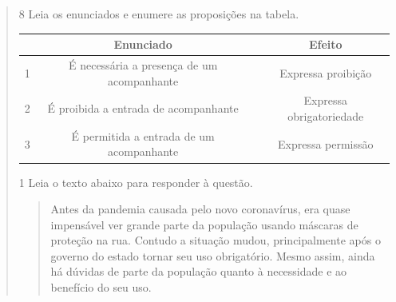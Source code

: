 \begin{quote}

\num{8} Leia os enunciados e enumere as proposições na tabela.

\begin{table}[]
\begin{tabular}{|c|c|c|c|}
\hline
\rowcolor[HTML]{ECF4FF} 
 & Enunciado &  & Efeito \\ \hline
1 & É necessária a presença de um acompanhante &  & Expressa proibição \\ \hline
2 & É proibida a entrada de acompanhante &  & Expressa obrigatoriedade \\ \hline
3 & É permitida a entrada de um acompanhante &  & Expressa permissão \\ \hline
\end{tabular}
\end{table}





%
%




\num{1} Leia o texto abaixo para responder à questão.

\begin{quote}

Antes da pandemia causada pelo novo coronavírus, era quase impensável
ver grande parte da população usando máscaras de proteção na rua.
Contudo a situação mudou, principalmente após o governo do estado tornar
seu uso obrigatório. Mesmo assim, ainda há dúvidas de parte da população
quanto à necessidade e ao benefício do seu uso.


\end{quote}
\end{quote}

